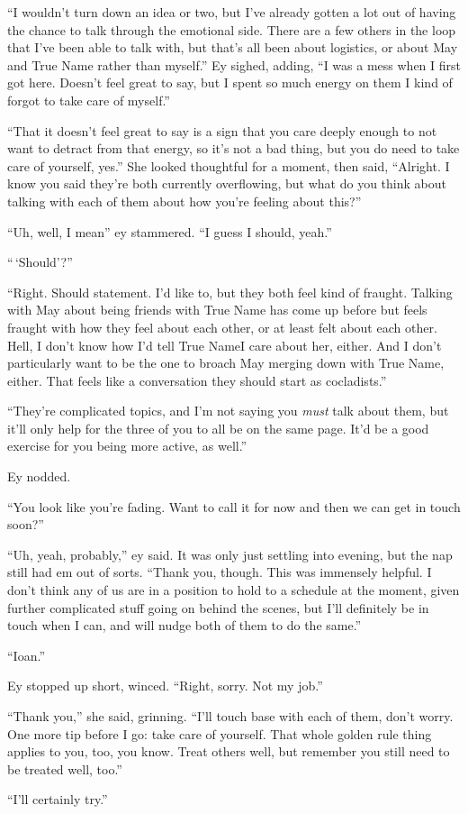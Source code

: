 ``I wouldn't turn down an idea or two, but I've already gotten a lot out of having the chance to talk through the emotional side. There are a few others in the loop that I've been able to talk with, but that's all been about logistics, or about May and True Name rather than myself.'' Ey sighed, adding, ``I was a mess when I first got here. Doesn't feel great to say, but I spent so much energy on them I kind of forgot to take care of myself.''

``That it doesn't feel great to say is a sign that you care deeply enough to not want to detract from that energy, so it's not a bad thing, but you do need to take care of yourself, yes.'' She looked thoughtful for a moment, then said, ``Alright. I know you said they're both currently overflowing, but what do you think about talking with each of them about how you're feeling about this?''

``Uh, well, I mean'' ey stammered. ``I guess I should, yeah.''

``\,`Should'?''

``Right. Should statement. I'd like to, but they both feel kind of fraught. Talking with May about being friends with True Name has come up before but feels fraught with how they feel about each other, or at least felt about each other. Hell, I don't know how I'd tell True NameI care about her, either. And I don't particularly want to be the one to broach May merging down with True Name, either. That feels like a conversation they should start as cocladists.''

``They're complicated topics, and I'm not saying you \emph{must} talk about them, but it'll only help for the three of you to all be on the same page. It'd be a good exercise for you being more active, as well.''

Ey nodded.

``You look like you're fading. Want to call it for now and then we can get in touch soon?''

``Uh, yeah, probably,'' ey said. It was only just settling into evening, but the nap still had em out of sorts. ``Thank you, though. This was immensely helpful. I don't think any of us are in a position to hold to a schedule at the moment, given further complicated stuff going on behind the scenes, but I'll definitely be in touch when I can, and will nudge both of them to do the same.''

``Ioan.''

Ey stopped up short, winced. ``Right, sorry. Not my job.''

``Thank you,'' she said, grinning. ``I'll touch base with each of them, don't worry. One more tip before I go: take care of yourself. That whole golden rule thing applies to you, too, you know. Treat others well, but remember you still need to be treated well, too.''

``I'll certainly try.''
